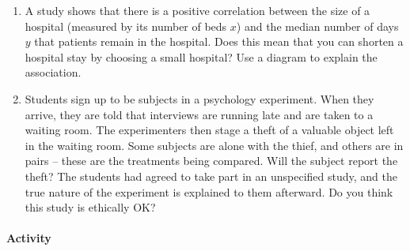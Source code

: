 \documentclass[10pt]{article}\usepackage[]{graphicx}\usepackage[]{color}
\newcommand{\ans}{\vspace{0.25in}}
\begin{document}
\begin{enumerate}
  \vspace{2in}
  
  \item A study shows that there is a positive correlation between the size of a hospital (measured by its number of beds $x$) and the median number of days $y$ that patients remain in the hospital. Does this mean that you can shorten a hospital stay by choosing a small hospital? Use a diagram to explain the association.
  
  \vspace{2in}
  
  \item Students sign up to be subjects in a psychology experiment. When they arrive, they are told that interviews are running late and are taken to a waiting room. The experimenters then stage a theft of a valuable object left in the waiting room. Some subjects are alone with the thief, and others are in pairs -- these are the treatments being compared. Will the subject report the theft? The students had agreed to take part in an unspecified study, and the true nature of the experiment is explained to them afterward. Do you think this study is ethically OK?
  \ans
\end{enumerate}


\paragraph{Activity}
\end{document}
